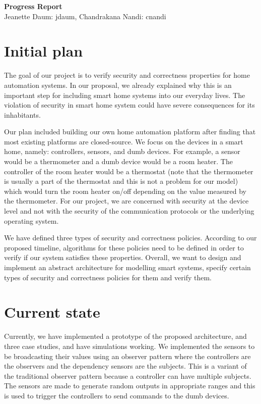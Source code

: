 \documentclass{article}
\begin{document}
\begin{center}
\large \textbf{Progress Report}\\
\normalsize {Jeanette Daum: jdaum, Chandrakana Nandi: cnandi}
\end{center}
\section{Initial plan}
The goal of our project is to verify security and correctness properties for home automation systems. In our proposal, we already explained why this is an important step for including smart home systems into our everyday lives. The violation of security in smart home system could have severe consequences for its inhabitants. 

Our plan included building our own home automation platform after finding that most existing platforms are closed-source. We focus on the devices in a smart home, namely: controllers, sensors, and dumb devices. For example, a sensor would be a thermometer and a dumb device would be a room heater. The controller of the room heater would be a thermostat (note that the thermometer is usually a part of the thermostat and this is not a problem for our model) which would turn the room heater on/off depending on the value measured by the thermometer. For our project, we are concerned with security at the device level and not with the security of the communication protocols or the underlying operating system. 

We have defined three types of security and correctness policies. According to our proposed timeline, algorithms for these policies need to be defined in order to verify if our system satisfies these properties. Overall, we want to design and implement an abstract architecture for modelling smart systems, specify certain types of security and correctness policies for them and verify them. 

\section{Current state}
Currently, we have implemented a prototype of the proposed architecture, and three case studies, and have simulations working. We implemented the sensors to be broadcasting their values using an observer pattern where the controllers are the observers and the dependency sensors are the subjects. This is a variant of the traditional observer pattern because a controller can have multiple subjects. The sensors are made to generate random outputs in appropriate ranges and this is used to trigger the controllers to send commands to the dumb devices. 
\end{document}
